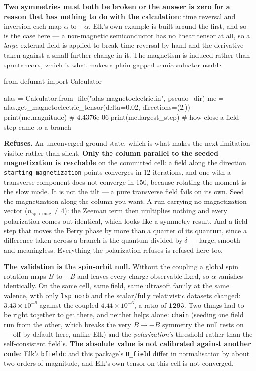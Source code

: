 \documentclass[11pt,a4paper]{article}
\newcommand{\code}[1]{\texttt{\small #1}}
\begin{document}
\textbf{Two symmetries must both be broken or the answer is zero for a reason
that has nothing to do with the calculation}: time reversal and inversion each
map $\alpha$ to $-\alpha$. Elk's own example is built around the first, and so is
the case here --- a non-magnetic semiconductor has no linear tensor at all, so a
\emph{large} external field is applied to break time reversal by hand and the
derivative taken against a small further change in it. The magnetism is induced
rather than spontaneous, which is what makes a plain gapped semiconductor usable.

\begin{pycode}
from defumat import Calculator

alas = Calculator.from_file("alas-magnetoelectric.in", pseudo_dir)
me = alas.get_magnetoelectric_tensor(delta=0.02, directions=(2,))
print(me.magnitude)        # 4.4376e-06
print(me.largest_step)     # how close a field step came to a branch
\end{pycode}

\begin{refuses}
\textbf{Refuses.} An unconverged ground state, which is what makes the next
limitation visible rather than silent. \textbf{Only the column parallel to the
seeded magnetization is reachable} on the committed cell: a field along the
direction \code{starting\_magnetization} points converges in 12 iterations, and
one with a transverse component does not converge in 150, because rotating the
moment is the slow mode. It is not the tilt --- a pure transverse field fails on
its own. Seed the magnetization along the column you want. A run carrying no
magnetization vector ($n_{\mathrm{spin,mag}} \neq 4$): the Zeeman term then multiplies nothing and every polarization comes out
identical, which looks like a symmetry result. And a field step that moves the
Berry phase by more than a quarter of its quantum, since a difference taken across
a branch is the quantum divided by $\delta$ --- large, smooth and meaningless.
Everything the polarization refuses is refused here too.
\end{refuses}

\textbf{The validation is the spin-orbit null.} Without the coupling a global spin
rotation maps $B$ to $-B$ and leaves every charge observable fixed, so $\alpha$
vanishes identically. On the same cell, same field, same ultrasoft family at the
same valence, with only \code{lspinorb} and the scalar/fully relativistic datasets
changed: $3.43\times10^{-9}$ against the coupled $4.44\times10^{-6}$, a ratio of
\textbf{1293}. Two things had to be right together to get there, and neither helps
alone: \code{chain} (seeding one field run from the other, which breaks the very
$B \to -B$ symmetry the null rests on --- off by default here, unlike Elk) and the
\emph{polarization's} threshold rather than the self-consistent field's.
\textbf{The absolute value is not calibrated against another code}: Elk's
\code{bfieldc} and this package's \code{B\_field} differ in normalisation by about
two orders of magnitude, and Elk's own tensor on this cell is not converged.
\end{document}
